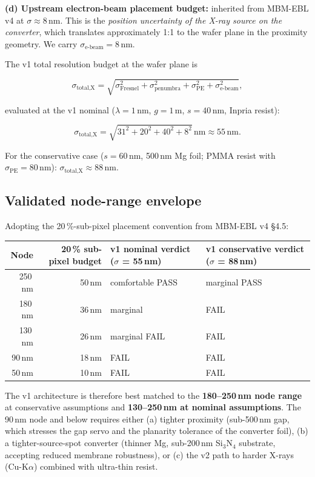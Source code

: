 \documentclass[11pt,letterpaper]{article}
\begin{document}
\textbf{(d) Upstream electron-beam placement budget:} inherited from MBM-EBL v4 at $\sigma \approx 8$\,nm. This is the \textit{position uncertainty of the X-ray source on the converter}, which translates approximately 1:1 to the wafer plane in the proximity geometry. We carry $\sigma_\text{e-beam} = 8$\,nm.

The v1 total resolution budget at the wafer plane is

\begin{equation}
\sigma_\text{total,X} = \sqrt{\sigma_\text{Fresnel}^2 + \sigma_\text{penumbra}^2 + \sigma_\text{PE}^2 + \sigma_\text{e-beam}^2},
\end{equation}

evaluated at the v1 nominal ($\lambda = 1$\,nm, $g = 1$\,\textmu m, $s = 40$\,nm, Inpria resist):

$$\sigma_\text{total,X} = \sqrt{31^2 + 20^2 + 40^2 + 8^2}\,\text{nm} \approx 55\,\text{nm}.$$

For the conservative case ($s = 60$\,nm, 500\,nm Mg foil; PMMA resist with $\sigma_\text{PE} = 80$\,nm): $\sigma_\text{total,X} \approx 88$\,nm.

\subsection{Validated node-range envelope}

Adopting the 20\,\%-sub-pixel placement convention from MBM-EBL v4 \S 4.5:

\begin{center}
\begin{tabular}{rrll}
\toprule
Node & 20\,\% sub-pixel budget & v1 nominal verdict ($\sigma$ = 55\,nm) & v1 conservative verdict ($\sigma$ = 88\,nm) \\
\midrule
250\,nm & 50\,nm & comfortable PASS & marginal PASS \\
180\,nm & 36\,nm & marginal & FAIL \\
130\,nm & 26\,nm & marginal FAIL & FAIL \\
90\,nm & 18\,nm & FAIL & FAIL \\
50\,nm & 10\,nm & FAIL & FAIL \\
\bottomrule
\end{tabular}
\end{center}

The v1 architecture is therefore best matched to the \textbf{180--250\,nm node range} at conservative assumptions and \textbf{130--250\,nm at nominal assumptions}. The 90\,nm node and below requires either (a) tighter proximity (sub-500\,nm gap, which stresses the gap servo and the planarity tolerance of the converter foil), (b) a tighter-source-spot converter (thinner Mg, sub-200\,nm Si$_3$N$_4$ substrate, accepting reduced membrane robustness), or (c) the v2 path to harder X-rays (Cu-K$\alpha$) combined with ultra-thin resist.
\end{document}
